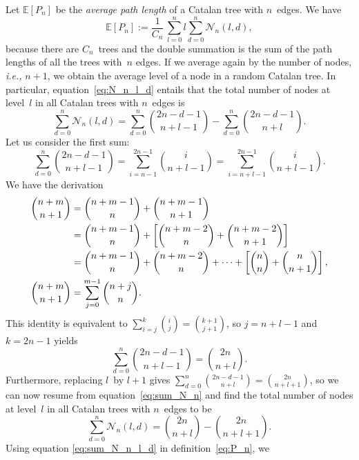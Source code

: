 \documentclass[11pt]{article}
\newcommand\Expected[1]{\mathbb{E}[{#1}]}
\begin{document}
Let \(\Expected{P_n}\) be the \emph{average path length} of a Catalan
tree with \(n\)~edges. We have
\begin{equation}
  \Expected{P_n} := \frac{1}{C_{n}} \,
  \sum_{l=0}^{n}l\sum_{d=0}^{n}\mathcal{N}_n(l,d),
\label{eq:P_n}
\end{equation}
because there are \(C_n\)~trees and the double summation is the sum of
the path lengths of all the trees with~\(n\) edges. If we average
again by the number of nodes, \emph{i.e.,} \(n+1\), we obtain the
average level of a node in a random Catalan tree.  In particular,
equation~\eqref{eq:N_n_l_d} entails that the total number of nodes at
level~\(l\) in all Catalan trees with \(n\)~edges is
\begin{equation}
\sum_{d=0}^{n}\mathcal{N}_n(l,d)
  = \sum_{d=0}^{n}\binom{2n-d-1}{n+l-1}
    - \sum_{d=0}^{n}\binom{2n-d-1}{n+l}.
\label{eq:sum_N_n}
\end{equation}
Let us consider the first sum:
\begin{equation*}
\sum_{d=0}^{n}\binom{2n-d-1}{n+l-1}
  = \sum_{i=n-1}^{2n-1}\binom{i}{n+l-1}
  = \sum_{i=n+l-1}^{2n-1}\binom{i}{n+l-1}.
\end{equation*}
We have the derivation
\begin{align*}
\binom{n+m}{n+1}
  &= \binom{n+m-1}{n} + \binom{n+m-1}{n+1}\notag\\
  &= \binom{n+m-1}{n} + \left[\binom{n+m-2}{n} +
     \binom{n+m-2}{n+1}\right]\notag\\
  &= \binom{n+m-1}{n} + \binom{n+m-2}{n} + \dots +
     \left[\binom{n}{n} + \binom{n}{n+1}\right],\notag\\
\binom{n+m}{n+1}
  &= \sum_{j=0}^{m-1}{\binom{n+j}{n}}.
\end{align*}
This identity is equivalent to \(\sum_{i=j}^{k}\binom{i}{j} =
\binom{k+1}{j+1}\), so \(j=n+l-1\) and \(k=2n-1\) yields
\begin{equation*}
\sum_{d=0}^{n}\binom{2n-d-1}{n+l-1} = \binom{2n}{n+l}.
\end{equation*}
Furthermore, replacing \(l\)~by \(l+1\) gives
\(\sum_{d=0}^{n}\binom{2n-d-1}{n+l} = \binom{2n}{n+l+1}\), so we can
now resume from equation~\eqref{eq:sum_N_n} and find the total number
of nodes at level~\(l\) in all Catalan trees with \(n\)~edges to be
\begin{equation}
\sum_{d=0}^{n}\mathcal{N}_n(l,d)
 = \binom{2n}{n+l} - \binom{2n}{n+l+1}.
\label{eq:sum_N_n_l_d}
\end{equation}
Using equation \eqref{eq:sum_N_n_l_d} in definition~\eqref{eq:P_n}, we
\end{document}
